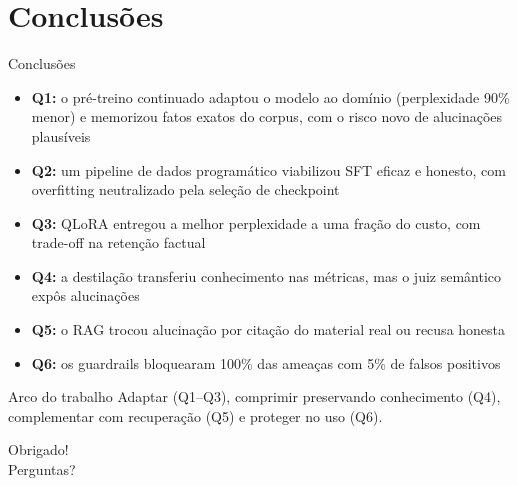 \documentclass[10pt,aspectratio=169]{beamer}
\begin{document}
\section{Conclusões}

\begin{frame}{Conclusões}
  \small
  \begin{itemize}
    \item \textbf{Q1:} o pré-treino continuado adaptou o modelo ao domínio (perplexidade 90\% menor) e memorizou fatos exatos do corpus, com o risco novo de alucinações plausíveis
    \item \textbf{Q2:} um pipeline de dados programático viabilizou SFT eficaz e honesto, com overfitting neutralizado pela seleção de checkpoint
    \item \textbf{Q3:} QLoRA entregou a melhor perplexidade a uma fração do custo, com trade-off na retenção factual
    \item \textbf{Q4:} a destilação transferiu conhecimento nas métricas, mas o juiz semântico expôs alucinações
    \item \textbf{Q5:} o RAG trocou alucinação por citação do material real ou recusa honesta
    \item \textbf{Q6:} os guardrails bloquearam 100\% das ameaças com 5\% de falsos positivos
  \end{itemize}
  \vfill
  \begin{exampleblock}{Arco do trabalho}
    Adaptar (Q1--Q3), comprimir preservando conhecimento (Q4), complementar com recuperação (Q5) e proteger no uso (Q6).
  \end{exampleblock}
\end{frame}

\begin{frame}[standout]
  Obrigado! \\ \vspace{0.5em} {\small Perguntas?}
\end{frame}
\end{document}
